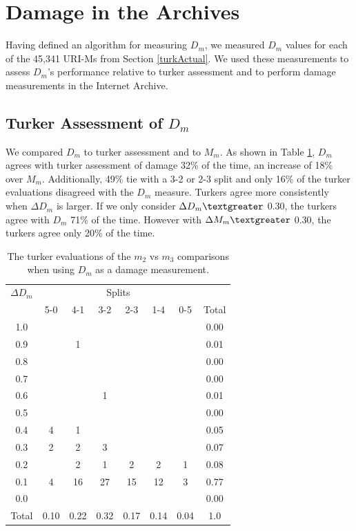 \section{Damage in the Archives}
\label{eval} 

Having defined an algorithm for measuring $D_m$, we measured $D_m$ values for each of the 45,341 URI-Ms from Section \ref{turkActual}. We used these measurements to assess $D_m$'s performance relative to turker assessment and to perform damage measurements in the Internet Archive.

\subsection{Turker Assessment of $D_m$}
\label{turkerDm}


We compared $D_m$ to turker assessment and to $M_m$. As shown in Table \ref{m2table}, $D_m$ agrees with turker assessment of damage 32\% of the time, an increase of 18\% over $M_m$. Additionally, 49\% tie with a 3-2 or 2-3 split and only 16\% of the turker evaluations disagreed with the $D_m$ measure. Turkers agree more consistently when {$\Delta D_m$} is larger. If we only consider {$\Delta D_m \textgreater$} 0.30, the turkers agree with $D_m$ 71\% of the time. However with {$\Delta M_m \textgreater$} 0.30, the turkers agree only 20\% of the time. 


\begin{table}
\begin{tabular}{ c | c | c | c | c | c | c || c}
    {$\Delta D_m$} &  \multicolumn{6}{c}{Splits}\\
  & 5-0 & 4-1 & 3-2 & 2-3 & 1-4 & 0-5 & Total\\
\hline
1.0 &  &  &  &  &  & & 0.00\\
0.9 &  & 1 &  &  &  & & 0.01\\
0.8 &  &  &  &  &  & & 0.00\\
0.7 &  &  &  &  &  & & 0.00\\
0.6 &  &  & 1 &  &  & & 0.01\\
0.5 &  &  &  &  &  & & 0.00\\
0.4 & 4 & 1 &  &  &  & & 0.05\\
0.3 & 2 & 2 & 3 &  &  & & 0.07\\
0.2 &  & 2 & 1 & 2 & 2 & 1& 0.08\\
0.1 & 4 & 16 & 27 & 15 & 12 & 3& 0.77\\
0.0 &  &  &  &  &  & & 0.00\\
\hline
Total & 0.10 & 0.22 & 0.32 & 0.17 & 0.14 & 0.04 & 1.0
\end{tabular}
  \caption{The turker evaluations of the $m_2$ vs $m_3$ comparisons when using $D_m$ as a damage measurement.}
  \label{m2table}
\end{table}



